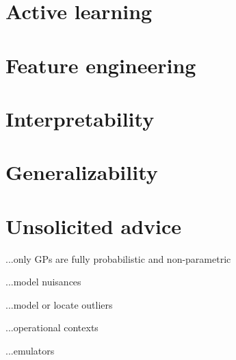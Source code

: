 \documentclass[12pt, twoside, letterpaper]{article}
\begin{document}
\section{Active learning}

\section{Feature engineering}

\section{Interpretability}

\section{Generalizability}

\section{Unsolicited advice}

...only GPs are fully probabilistic and non-parametric

...model nuisances

...model or locate outliers

...operational contexts

...emulators
\end{document}
